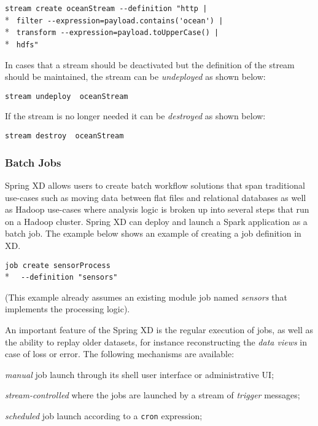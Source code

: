 \verb;stream create oceanStream --definition "http |;\\*
\verb; filter --expression=payload.contains('ocean') |;\\*
\verb; transform --expression=payload.toUpperCase() |;\\*
\verb; hdfs";

In cases that a stream should be deactivated but the definition of the stream
should be maintained, the stream can be \emph{undeployed} as shown below:

\verb;stream undeploy  oceanStream ;

If the stream is no longer needed it can be \emph{destroyed} as shown below:

\verb;stream destroy  oceanStream ;

\subsubsection {Batch Jobs}

Spring XD allows users to create batch workflow solutions that span traditional
use-cases such as moving data between flat files and relational databases as 
well as Hadoop use-cases where analysis logic is broken up into several steps 
that run on a Hadoop cluster. Spring XD can deploy and launch a Spark application 
as a batch job.  The example below shows an example of creating a
job definition in XD.

\verb;job create sensorProcess;\\*
\verb;  --definition "sensors";

(This example already assumes an existing module job named \emph{sensors} that
implements the processing logic).

An important feature of the Spring XD is the regular
execution of jobs, as well as the ability to replay older datasets, for
instance reconstructing the \emph{data views} in case of loss or error.
The following mechanisms are available:

\begin{itemize*}
\item \emph{manual} job launch through its shell user interface or 
administrative UI;
\item \emph{stream-controlled} where the jobs are launched by a stream of 
\emph{trigger} messages;
\item \emph{scheduled} job launch according to a \texttt{cron} expression;
\end{itemize*}

